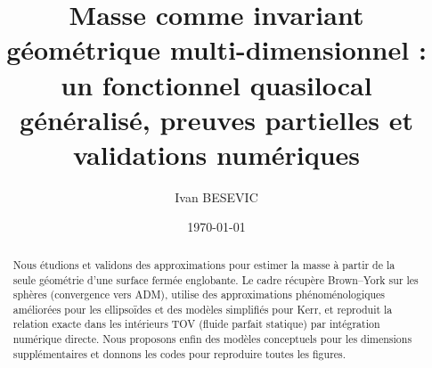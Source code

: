 \documentclass[11pt]{article}
\title{Masse comme invariant g\'eom\'etrique multi-dimensionnel : \\ 
un fonctionnel quasilocal g\'en\'eralis\'e, preuves partielles et validations num\'eriques}
\author{Ivan BESEVIC}
\date{\today}
\begin{document}
\maketitle

\begin{abstract}
Nous \'etudions et validons des approximations pour estimer la masse \`a partir de la seule g\'eom\'etrie d'une surface ferm\'ee englobante. 
Le cadre r\'ecup\`ere Brown--York sur les sph\`eres (convergence vers ADM), utilise des approximations ph\'enom\'enologiques am\'elior\'ees pour les ellipso\"ides et des mod\`eles simplifi\'es pour Kerr, et reproduit la relation exacte dans les int\'erieurs TOV (fluide parfait statique) par int\'egration num\'erique directe. 
Nous proposons enfin des mod\`eles conceptuels pour les dimensions suppl\'ementaires et donnons les codes pour reproduire toutes les figures.
\end{abstract}
\end{document}
